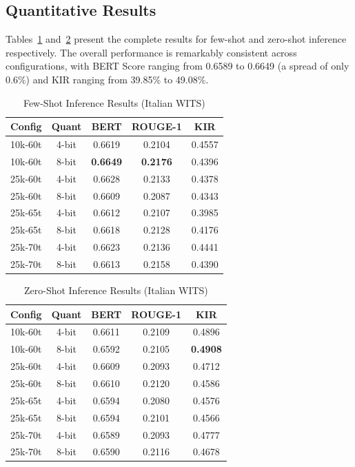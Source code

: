 \documentclass[conference]{IEEEtran}
\begin{document}
\subsection{Quantitative Results}

Tables~\ref{tab:few_shot} and~\ref{tab:zero_shot} present the complete results for few-shot and zero-shot inference respectively. The overall performance is remarkably consistent across configurations, with BERT Score ranging from 0.6589 to 0.6649 (a spread of only 0.6\%) and KIR ranging from 39.85\% to 49.08\%.

\begin{table}[htbp]
\caption{Few-Shot Inference Results (Italian WITS)}
\begin{center}
\begin{tabular}{lcccc}
\toprule
\textbf{Config} & \textbf{Quant} & \textbf{BERT} & \textbf{ROUGE-1} & \textbf{KIR} \\
\midrule
10k-60t & 4-bit & 0.6619 & 0.2104 & 0.4557 \\
10k-60t & 8-bit & \textbf{0.6649} & \textbf{0.2176} & 0.4396 \\
25k-60t & 4-bit & 0.6628 & 0.2133 & 0.4378 \\
25k-60t & 8-bit & 0.6609 & 0.2087 & 0.4343 \\
25k-65t & 4-bit & 0.6612 & 0.2107 & 0.3985 \\
25k-65t & 8-bit & 0.6618 & 0.2128 & 0.4176 \\
25k-70t & 4-bit & 0.6623 & 0.2136 & 0.4441 \\
25k-70t & 8-bit & 0.6613 & 0.2158 & 0.4390 \\
\bottomrule
\end{tabular}
\label{tab:few_shot}
\end{center}
\end{table}

\begin{table}[htbp]
\caption{Zero-Shot Inference Results (Italian WITS)}
\begin{center}
\begin{tabular}{lcccc}
\toprule
\textbf{Config} & \textbf{Quant} & \textbf{BERT} & \textbf{ROUGE-1} & \textbf{KIR} \\
\midrule
10k-60t & 4-bit & 0.6611 & 0.2109 & 0.4896 \\
10k-60t & 8-bit & 0.6592 & 0.2105 & \textbf{0.4908} \\
25k-60t & 4-bit & 0.6609 & 0.2093 & 0.4712 \\
25k-60t & 8-bit & 0.6610 & 0.2120 & 0.4586 \\
25k-65t & 4-bit & 0.6594 & 0.2080 & 0.4576 \\
25k-65t & 8-bit & 0.6594 & 0.2101 & 0.4566 \\
25k-70t & 4-bit & 0.6589 & 0.2093 & 0.4777 \\
25k-70t & 8-bit & 0.6590 & 0.2116 & 0.4678 \\
\bottomrule
\end{tabular}
\label{tab:zero_shot}
\end{center}
\end{table}
\end{document}
